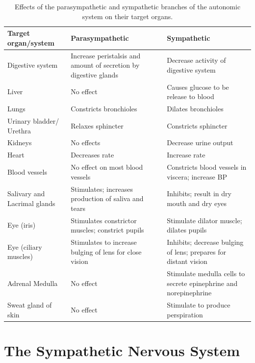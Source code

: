 \begin{longtable}[t]{>{\raggedright\arraybackslash}p{10em}>{\raggedright\arraybackslash}p{10em}>{\raggedright\arraybackslash}p{15em}}
\caption{\label{tab:autonomic}Effects of the parasympathetic and sympathetic branches of the autonomic system on their target organs.}\\
\toprule
Target organ/system & Parasympathetic & Sympathetic\\
\midrule
\rowcolor{gray!6}  Digestive system & Increase peristalsis and amount of secretion by digestive glands & Decrease activity of digestive system\\
Liver & No effect & Causes glucose to be release to blood\\
\rowcolor{gray!6}  Lungs & Constricts bronchioles & Dilates bronchioles\\
Urinary bladder/ Urethra & Relaxes sphincter & Constricts sphincter\\
\rowcolor{gray!6}  Kidneys & No effects & Decrease urine output\\
\addlinespace
Heart & Decreases rate & Increase rate\\
\rowcolor{gray!6}  Blood vessels & No effect on most blood vessels & Constricts blood vessels in viscera; increase BP\\
Salivary and Lacrimal glands & Stimulates; increases production of saliva and tears & Inhibits; result in dry mouth and dry eyes\\
\rowcolor{gray!6}  Eye (iris) & Stimulates constrictor muscles; constrict pupils & Stimulate dilator muscle; dilates pupils\\
Eye (ciliary muscles) & Stimulates to increase bulging of lens for close vision & Inhibits; decrease bulging of lens; prepares for distant vision\\
\addlinespace
\rowcolor{gray!6}  Adrenal Medulla & No effect & Stimulate medulla cells to secrete epinephrine and norepinephrine\\
Sweat gland of skin & No effect & Stimulate to produce perspiration\\
\bottomrule
\end{longtable}

\hypertarget{the-sympathetic-nervous-system}{%
\section{The Sympathetic Nervous System}\label{the-sympathetic-nervous-system}}

